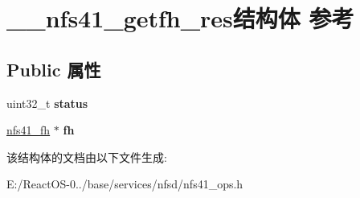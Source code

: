 \hypertarget{struct____nfs41__getfh__res}{}\section{\+\_\+\+\_\+nfs41\+\_\+getfh\+\_\+res结构体 参考}
\label{struct____nfs41__getfh__res}
\subsection*{Public 属性}
\begin{DoxyCompactItemize}
\item 
\mbox{\label{struct____nfs41__getfh__res_a9ce6c087b34dc4ab2bb2b341d5d42ac7}} 
uint32\+\_\+t {\bfseries status}
\item 
\mbox{\label{struct____nfs41__getfh__res_abad0daea3907f1f5fd98a63aad58e48d}} 
\hyperlink{struct____nfs41__fh}{nfs41\+\_\+fh} $\ast$ {\bfseries fh}
\end{DoxyCompactItemize}


该结构体的文档由以下文件生成\+:\begin{DoxyCompactItemize}
\item 
E\+:/\+React\+O\+S-\/0../base/services/nfsd/nfs41\+\_\+ops.\+h\end{DoxyCompactItemize}
